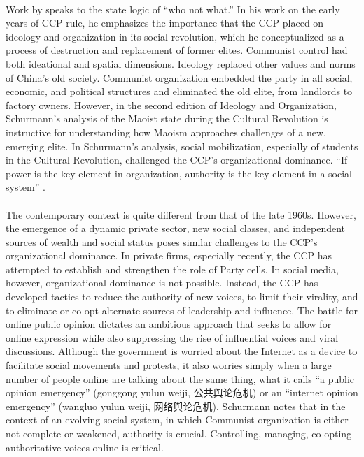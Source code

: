 \documentclass[12pt]{article}
\begin{document}
\begin{CJK*}{UTF8}{gbsn}
\paragraph{} Work by \cite{schurmann1968ideology} speaks to the state logic of ``who not what.'' In his work on the early years of CCP rule, he emphasizes the importance that the CCP placed on ideology and organization in its social revolution, which he conceptualized as a process of destruction and replacement of former elites. Communist control had both ideational and spatial dimensions. Ideology replaced other values and norms of China's old society. Communist organization embedded the party in all social, economic, and political structures and eliminated the old elite, from landlords to factory owners. However, in the second edition of Ideology and Organization, Schurmann's analysis of the Maoist state during the Cultural Revolution is instructive for understanding how Maoism approaches challenges of a new, emerging elite. In Schurmann's analysis, social mobilization, especially of students in the Cultural Revolution, challenged the CCP's organizational dominance. ``If power is the key element in organization, authority is the key element in a social system'' \citep[521]{schurmann1968ideology}.  

\paragraph{} The contemporary context is quite different from that of the late 1960s. However, the emergence of a dynamic private sector, new social classes, and independent sources of wealth and social status poses similar challenges to the CCP's organizational dominance. In private firms, especially recently, the CCP has attempted to establish and strengthen the role of Party cells. In social media, however, organizational dominance is not possible. Instead, the CCP has developed tactics to reduce the authority of new voices, to limit their virality, and to eliminate or co-opt alternate sources of leadership and influence. The battle for online public opinion dictates an ambitious approach that seeks to allow for online expression while also suppressing the rise of influential voices and viral discussions. Although the government is worried about the Internet as a device to facilitate social movements and protests, it also worries simply when a large number of people online are talking about the same thing, what it calls ``a public opinion emergency'' (gonggong yulun weiji, 公共舆论危机) or an ``internet opinion emergency'' (wangluo yulun weiji, 网络舆论危机). Schurmann notes that in the context of an evolving social system, in which Communist organization is either not complete or weakened, authority is crucial. Controlling, managing, co-opting authoritative voices online is critical. 


\end{CJK*}
\end{document}
